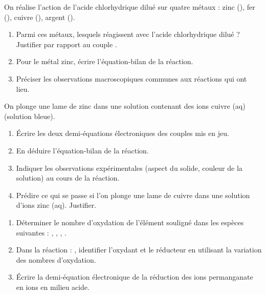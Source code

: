 \documentclass[11pt]{article}
\begin{document}
\begin{exercice}
On réalise l'action de l'acide chlorhydrique dilué sur quatre métaux : zinc (), fer (), cuivre (), argent ().
\begin{enumerate}
    \item Parmi ces métaux, lesquels réagissent avec l'acide chlorhydrique dilué ? Justifier par rapport au couple .
    \item Pour le métal zinc, écrire l'équation-bilan de la réaction.
    \item Préciser les observations macroscopiques communes aux réactions qui ont lieu.
\end{enumerate}
\end{exercice}

\begin{exercice}
On plonge une lame de zinc dans une solution contenant des ions cuivre (aq) (solution bleue).
\begin{enumerate}
    \item Écrire les deux demi-équations électroniques des couples mis en jeu.
    \item En déduire l'équation-bilan de la réaction.
    \item Indiquer les observations expérimentales (aspect du solide, couleur de la solution) au cours de la réaction.
    \item Prédire ce qui se passe si l'on plonge une lame de cuivre dans une solution d'ions zinc (aq). Justifier.
\end{enumerate}
\end{exercice}

\begin{exercice}
\begin{enumerate}
    \item Déterminer le nombre d'oxydation de l'élément souligné dans les espèces suivantes :
    , \quad {}, \quad {}, \quad {}.
    \item Dans la réaction : , identifier l'oxydant et le réducteur en utilisant la variation des nombres d'oxydation.
    \item Écrire la demi-équation électronique de la réduction des ions permanganate  en ions  en milieu acide.
\end{enumerate}
\end{exercice}
\end{document}
